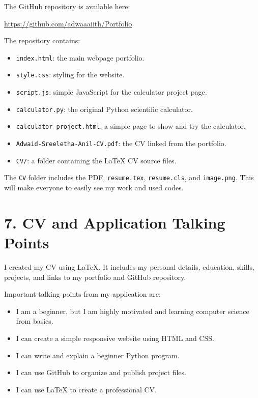 \documentclass[12pt,a4paper]{article}
\begin{document}
The GitHub repository is available here:

\href{https://github.com/adwaaaiith/Portfolio}{https://github.com/adwaaaiith/Portfolio}

The repository contains:

\begin{itemize}[leftmargin=*]
    \item \texttt{index.html}: the main webpage portfolio.
    \item \texttt{style.css}: styling for the website.
    \item \texttt{script.js}: simple JavaScript for the calculator project page.
    \item \texttt{calculator.py}: the original Python scientific calculator.
    \item \texttt{calculator-project.html}: a simple page to show and try the calculator.
    \item \texttt{Adwaid-Sreeletha-Anil-CV.pdf}: the CV linked from the portfolio.
    \item \texttt{CV/}: a folder containing the LaTeX CV source files.
\end{itemize}

The \texttt{CV} folder includes the PDF, \texttt{resume.tex}, \texttt{resume.cls}, and \texttt{image.png}. This will make everyone to easily see my work and used codes.

\section{7. CV and Application Talking Points}

I created my CV using LaTeX. It includes my personal details, education, skills, projects, and links to my portfolio and GitHub repository. 

Important talking points from my application are:

\begin{itemize}[leftmargin=*]
    \item I am a beginner, but I am highly motivated and learning computer science from basics.
    \item I can create a simple responsive website using HTML and CSS.
    \item I can write and explain a beginner Python program.
    \item I can use GitHub to organize and publish project files.
    \item I can use LaTeX to create a professional CV.
\end{itemize}
\end{document}
